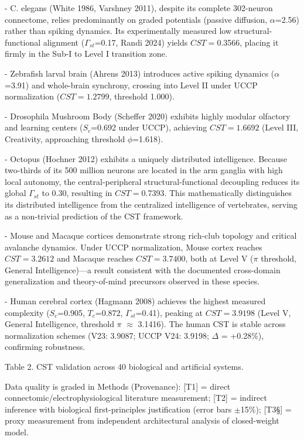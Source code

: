\documentclass[a4paper,12pt]{article}
\begin{document}
- C. elegans (White 1986, Varshney 2011), despite its complete 302-neuron connectome, relies predominantly on graded potentials (passive diffusion, $\alpha$=2.56) rather than spiking dynamics. Its experimentally measured low structural-functional alignment ($\Gamma_{st}$=0.17, Randi 2024) yields $CST = $0.3566, placing it firmly in the Sub-I to Level I transition zone.


- Zebrafish larval brain (Ahrens 2013) introduces active spiking dynamics ($\alpha$=3.91) and whole-brain synchrony, crossing into Level II under UCCP normalization ($CST = 1.2799$, threshold 1.000).


- Drosophila Mushroom Body (Scheffer 2020) exhibits highly modular olfactory and learning centers ($S_{c}$=0.692 under UCCP), achieving $CST = 1.6692$ (Level III, Creativity, approaching threshold $\phi$=1.618).


- Octopus (Hochner 2012) exhibits a uniquely distributed intelligence. Because two-thirds of its 500 million neurons are located in the arm ganglia with high local autonomy, the central-peripheral structural-functional decoupling reduces its global $\Gamma_{st}$ to 0.30, resulting in $CST = $0.7393. This mathematically distinguishes its distributed intelligence from the centralized intelligence of vertebrates, serving as a non-trivial prediction of the CST framework.


- Mouse and Macaque cortices demonstrate strong rich-club topology and critical avalanche dynamics. Under UCCP normalization, Mouse cortex reaches $CST = 3.2612$ and Macaque reaches $CST = 3.7400$, both at Level V ($\pi$ threshold, General Intelligence)---a result consistent with the documented cross-domain generalization and theory-of-mind precursors observed in these species.


- Human cerebral cortex (Hagmann 2008) achieves the highest measured complexity ($S_{c}$=0.905, $T_{c}$=0.872, $\Gamma_{st}$=0.41), peaking at $CST = 3.9198$ (Level V, General Intelligence, threshold $\pi$ $\approx$ 3.1416). The human CST is stable across normalization schemes (V23: 3.9087; UCCP V24: 3.9198; $\Delta$ = +0.28\%), confirming robustness.


Table 2. CST validation across 40 biological and artificial systems.


Data quality is graded in Methods (\SData Provenance): [T1] = direct connectomic/electrophysiological literature measurement; [T2\dag] = indirect inference with biological first-principles justification (error bars $\pm$15\%); [T3\S] = proxy measurement from independent architectural analysis of closed-weight model.
\end{document}
